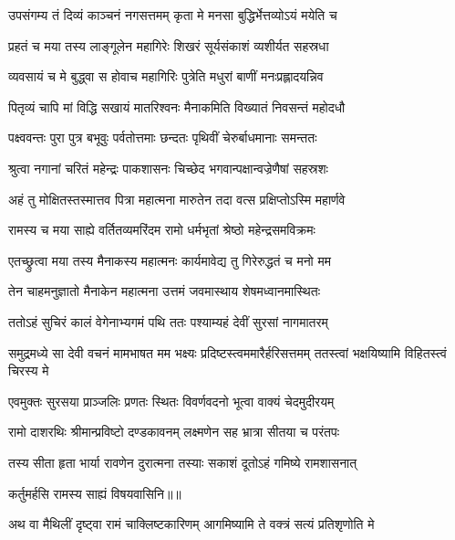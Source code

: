 \twolineshloka
{उपसंगम्य तं दिव्यं काञ्चनं नगसत्तमम्}
{कृता मे मनसा बुद्धिर्भेत्तव्योऽयं मयेति च} %

\twolineshloka
{प्रहतं च मया तस्य लाङ्गूलेन महागिरेः}
{शिखरं सूर्यसंकाशं व्यशीर्यत सहस्रधा} %

\twolineshloka
{व्यवसायं च मे बुद्ध्वा स होवाच महागिरिः}
{पुत्रेति मधुरां बाणीं मनःप्रह्लादयन्निव} %

\twolineshloka
{पितृव्यं चापि मां विद्धि सखायं मातरिश्वनः}
{मैनाकमिति विख्यातं निवसन्तं महोदधौ} %

\twolineshloka
{पक्ष्ववन्तः पुरा पुत्र बभूवुः पर्वतोत्तमाः}
{छन्दतः पृथिवीं चेरुर्बाधमानाः समन्ततः} %

\twolineshloka
{श्रुत्वा नगानां चरितं महेन्द्रः पाकशासनः}
{चिच्छेद भगवान्पक्षान्वज्रेणैषां सहस्रशः} %

\twolineshloka
{अहं तु मोक्षितस्तस्मात्तव पित्रा महात्मना}
{मारुतेन तदा वत्स प्रक्षिप्तोऽस्मि महार्णवे} %

\twolineshloka
{रामस्य च मया साह्ये वर्तितव्यमरिंदम}
{रामो धर्मभृतां श्रेष्ठो महेन्द्रसमविक्रमः} %

\twolineshloka
{एतच्छ्रुत्वा मया तस्य मैनाकस्य महात्मनः}
{कार्यमावेद्य तु गिरेरुद्धतं च मनो मम} %

\twolineshloka
{तेन चाहमनुज्ञातो मैनाकेन महात्मना}
{उत्तमं जवमास्थाय शेषमध्वानमास्थितः} %

\twolineshloka
{ततोऽहं सुचिरं कालं वेगेनाभ्यगमं पथि}
{ततः पश्याम्यहं देवीं सुरसां नागमातरम्} %

\threelineshloka
{समुद्रमध्ये सा देवी वचनं मामभाषत}
{मम भक्ष्यः प्रदिष्टस्त्वममारैर्हरिसत्तमम्}
{ततस्त्वां भक्षयिष्यामि विहितस्त्वं चिरस्य मे} %

\twolineshloka
{एवमुक्तः सुरसया प्राञ्जलिः प्रणतः स्थितः}
{विवर्णवदनो भूत्वा वाक्यं चेदमुदीरयम्} %

\twolineshloka
{रामो दाशरथिः श्रीमान्प्रविष्टो दण्डकावनम्}
{लक्ष्मणेन सह भ्रात्रा सीतया च परंतपः} %

\twolineshloka
{तस्य सीता हृता भार्या रावणेन दुरात्मना}
{तस्याः सकाशं दूतोऽहं गमिष्ये रामशासनात्} %

{कर्तुमर्हसि रामस्य साह्यं विषयवासिनि॥॥} %

\addtocounter{shlokacount}{1}

\twolineshloka
{अथ वा मैथिलीं दृष्ट्वा रामं चाक्लिष्टकारिणम्}
{आगमिष्यामि ते वक्त्रं सत्यं प्रतिशृणोति मे} %

